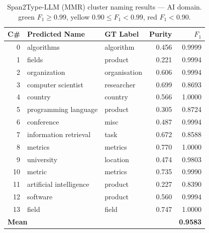 \documentclass[11pt,a4paper]{article}
\begin{document}
\begin{table}[ht]
\centering
\small
\caption{Span2Type-LLM (MMR) cluster naming results --- AI domain.
\colorbox{green!15}{green} $F_1 \geq 0.99$,
\colorbox{yellow!25}{yellow} $0.90 \leq F_1 < 0.99$,
\colorbox{red!15}{red} $F_1 < 0.90$.}
\label{tab:naming_ai}
\setlength{\tabcolsep}{5pt}
\begin{tabular}{r l l r r}
\toprule
\textbf{C\#} & \textbf{Predicted Name} & \textbf{GT Label} & \textbf{Purity} & \textbf{$F_1$} \\
\midrule
   0 & algorithms                     & algorithm              & 0.456 & \cellcolor{green!15}0.9999 \\
   1 & fields                         & product                & 0.221 & \cellcolor{green!15}0.9994 \\
   2 & organization                   & organisation           & 0.606 & \cellcolor{green!15}0.9994 \\
   3 & computer scientist             & researcher             & 0.699 & \cellcolor{red!15}0.8693 \\
   4 & country                        & country                & 0.566 & \cellcolor{green!15}1.0000 \\
   5 & programming language           & product                & 0.305 & \cellcolor{red!15}0.8724 \\
   6 & conference                     & misc                   & 0.487 & \cellcolor{green!15}0.9994 \\
   7 & information retrieval          & task                   & 0.672 & \cellcolor{red!15}0.8588 \\
   8 & metrics                        & metrics                & 0.770 & \cellcolor{green!15}1.0000 \\
   9 & university                     & location               & 0.474 & \cellcolor{yellow!25}0.9803 \\
  10 & metric                         & metrics                & 0.735 & \cellcolor{green!15}0.9990 \\
  11 & artificial intelligence        & product                & 0.227 & \cellcolor{red!15}0.8390 \\
  12 & software                       & product                & 0.560 & \cellcolor{green!15}0.9994 \\
  13 & field                          & field                  & 0.747 & \cellcolor{green!15}1.0000 \\
\midrule
\multicolumn{3}{l}{\textbf{Mean}} & & \textbf{0.9583} \\
\bottomrule
\end{tabular}
\end{table}
\end{document}
